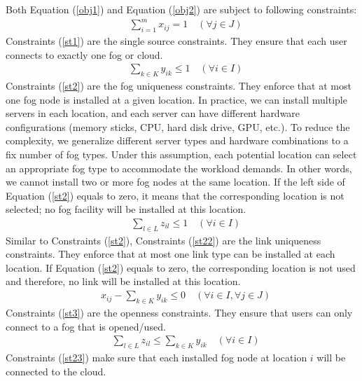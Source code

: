 \documentclass[10pt,journal,compsoc]{IEEEtran}
\newcommand{\Eq}[1]{(\ref{#1})}
\begin{document}
Both Equation \Eq{obj1} and Equation \Eq{obj2} are subject to following constraints:
\begin{align}
&\sum_{i=1}^m x_{ij} =1\quad  (\forall j \in J )\label{st1}
\end{align}
Constraints \Eq{st1} are the single source constraints. They ensure that each user connects to exactly one fog or cloud. \\
\begin{align}
&\sum_{k\in K} y_{ik} \leq1 \quad(\forall i \in I )\label{st2}
\end{align}
Constraints \Eq{st2} are the fog uniqueness constraints. They enforce that at most one fog node is installed at a given location.  In practice, we can install multiple servers in each location, and each server can have different hardware configurations (memory sticks, CPU, hard disk drive, GPU, etc.). To reduce the complexity, we generalize different server types and hardware combinations to a fix number of fog types. Under this assumption, each potential location can select an appropriate fog type to accommodate the workload demands. In other words, we cannot install two or more fog nodes at the same location. If the left side of Equation \Eq{st2} equals to zero, it means that the corresponding location is not selected; no fog facility will be installed at this location.\\
\begin{align}
&\sum_{l\in L} z_{il} \leq1\quad(\forall i \in I) \label{st22} %
\end{align}
Similar to Constraints \Eq{st2}, Constraints \Eq{st22} are the link uniqueness constraints. They enforce that at most one link type can be installed at each location. If Equation \Eq{st2} equals to zero, the corresponding location is not used and therefore, no link will be installed at this location.\\
\begin{align}
& x_{ij} - \sum_{k\in K} y_{ik}\leq0  \quad(\forall i \in I,\forall j \in J)\label{st3}
\end{align}
Constraints \Eq{st3} are the openness constraints. They ensure that users can only connect to a fog that is opened/used.\\ 
\begin{align}
&\sum_{l\in L} z_{il} \leq \sum_{k\in K} y_{ik} \quad (\forall i \in I) \label{st23}
\end{align}
Constraints \Eq{st23} make sure that each installed fog node at location $i$ will be connected to the cloud.\\
\end{document}
